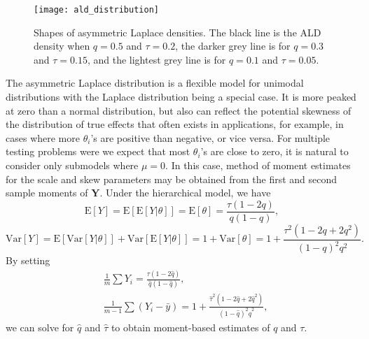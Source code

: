 \documentclass[11pt]{article}
\newcommand{\Exp}[1]{{\text{E}}[ \ensuremath{ #1 } ]  }
\newcommand{\Var}[1]{{\text{Var}}[ \ensuremath{ #1 } ]  }
\newcommand{\bs}[1]{{\boldsymbol #1}}
\begin{document}
\begin{figure}[!h]
	\centering
	\texttt{[image: ald\_distribution]}
	\caption{Shapes of asymmetric Laplace densities. The black line is the ALD density when $q = 0.5$ and $\tau = 0.2$, the darker grey line is for $q = 0.3$ and $\tau = 0.15$, and the lightest grey line is for $q=0.1$ and $\tau=0.05$. }
	\label{fig:ald_dist}
\end{figure} 
The asymmetric Laplace distribution is a flexible model for unimodal distributions with the Laplace distribution being a special case. It is more peaked at zero than a normal distribution, but also can reflect the potential skewness of 
the distribution of true effects that often exists in applications, for example, in cases where more $\theta_i$'s are positive than negative, or vice versa. 
For multiple testing problems were we expect that most $\theta_i$'s are
close to zero, it is natural to consider only submodels where $\mu=0$. 
In this case, 
method of moment estimates for the scale and skew parameters 
may be obtained from the first and second sample moments of $\bs Y$. 
Under the hierarchical model, we have 
\begin{equation*}
	\Exp{Y} = \Exp{\Exp{Y|\theta}} = \Exp{\theta} = \frac{\tau (1-2q)}{q(1-q)},
\end{equation*}
\begin{equation*}
	\Var{Y} = \Exp{\Var{Y|\theta}} + \Var{\Exp{Y|\theta}} = 1 + \Var{\theta} = 1 + 
	\frac{\tau^2(1-2q+2q^2)}{(1-q)^2q^2}.
\end{equation*}
By setting
\begin{equation*}
	\begin{split}
		&\frac{1}{m}\sum Y_i = \frac{\tau (1-2\hat q)}{\hat q(1-\hat q)}, \\
		&  \frac{1}{m-1} \sum (Y_i - \bar y) = 1 + 
		\frac{\hat \tau^2(1-2\hat q+2\hat q^2)}{(1-\hat q)^2\hat q^2},
	\end{split}
\end{equation*}
we can solve for $\hat q$ and $\hat \tau$ to  obtain moment-based estimates of $q$ and $\tau$. %
\end{document}
